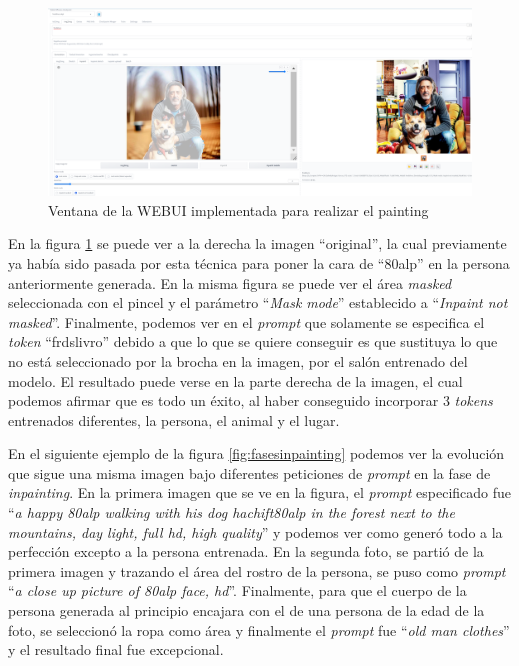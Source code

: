\begin{figure}[h]
	\centering
	\includegraphics[width = 1
	\textwidth]{Imagenes/Vectorial/inpainting1.png}
	\caption{Ventana de la WEBUI implementada para realizar el painting}
	\label{fig:inpainting1}
\end{figure}

En la figura \ref{fig:inpainting1} se puede ver a la derecha la imagen ``original'', la cual previamente ya había sido pasada por esta técnica para poner la cara de ``80alp'' en la persona anteriormente generada. En la misma figura se puede ver el área \textit{masked} seleccionada con el pincel y el parámetro ``\textit{Mask mode}'' establecido a ``\textit{Inpaint not masked}''. Finalmente, podemos ver en el \textit{prompt} que solamente se especifica el \textit{token} ``frdslivro'' debido a que lo que se quiere conseguir es que sustituya lo que no está seleccionado por la brocha en la imagen, por el salón entrenado del modelo. El resultado puede verse en la parte derecha de la imagen, el cual podemos afirmar que es todo un éxito, al haber conseguido incorporar 3 \textit{tokens} entrenados diferentes, la persona, el animal y el lugar. 

En el siguiente ejemplo de la figura \ref{fig:fasesinpainting} podemos ver la evolución que sigue una misma imagen bajo diferentes peticiones de \textit{prompt} en la fase de \textit{inpainting}. En la primera imagen que se ve en la figura, el \textit{prompt} especificado fue ``\textit{a happy 80alp walking with his dog hachift80alp in the forest next to the mountains, day light, full hd, high quality}'' y podemos ver como generó todo a la perfección excepto a la persona entrenada. En la segunda foto, se partió de la primera imagen y trazando el área del rostro de la persona, se puso como \textit{prompt} ``\textit{a close up picture of 80alp face, hd}''. Finalmente, para que el cuerpo de la persona generada al principio encajara con el de una persona de la edad de la foto, se seleccionó la ropa como área y finalmente el \textit{prompt} fue ``\textit{old man clothes}'' y el resultado final fue excepcional. 

